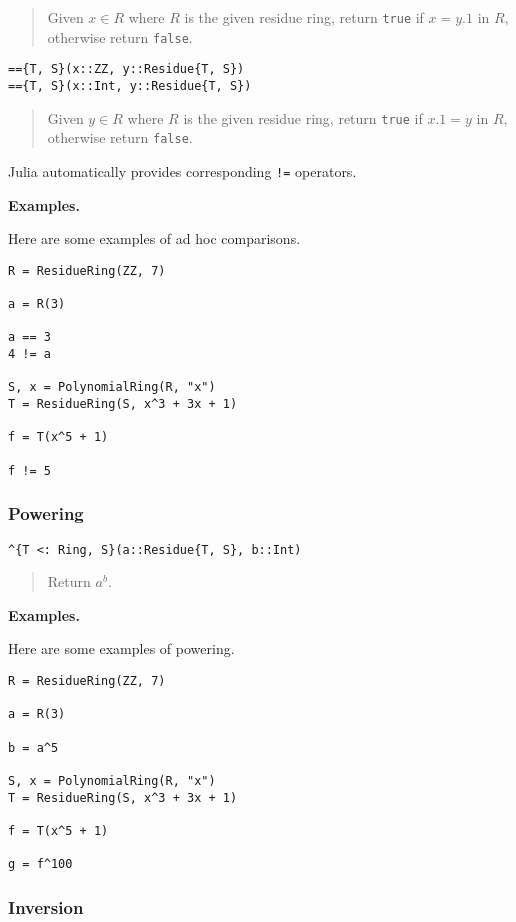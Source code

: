 \documentclass[a4paper,10pt]{article}
\newcommand{\code}{\lstinline}
\newcommand{\desc}[1]{\vspace{-3mm}\begin{quote}#1\end{quote}}
\begin{document}
{{{\desc{Given $x \in R$ where $R$ is the given residue ring, return \code{true} 
if $x = y.1$ in $R$, otherwise return \code{false}.}

\begin{lstlisting}
=={T, S}(x::ZZ, y::Residue{T, S})
=={T, S}(x::Int, y::Residue{T, S})
\end{lstlisting}

\desc{Given $y \in R$ where $R$ is the given residue ring, return \code{true} 
if $x.1 = y$ in $R$, otherwise return \code{false}.}

Julia automatically provides corresponding \code{!=} operators.

\textbf{Examples.}

Here are some examples of ad hoc comparisons.

\begin{lstlisting}
R = ResidueRing(ZZ, 7)

a = R(3)

a == 3
4 != a

S, x = PolynomialRing(R, "x")
T = ResidueRing(S, x^3 + 3x + 1)

f = T(x^5 + 1)

f != 5
\end{lstlisting}

\subsubsection{Powering}

\begin{lstlisting}
^{T <: Ring, S}(a::Residue{T, S}, b::Int)
\end{lstlisting}

\desc{Return $a^b$.}

\textbf{Examples.}

Here are some examples of powering.

\begin{lstlisting}
R = ResidueRing(ZZ, 7)

a = R(3)

b = a^5

S, x = PolynomialRing(R, "x")
T = ResidueRing(S, x^3 + 3x + 1)

f = T(x^5 + 1)

g = f^100
\end{lstlisting}

\subsubsection{Inversion}

}}}
\end{document}

